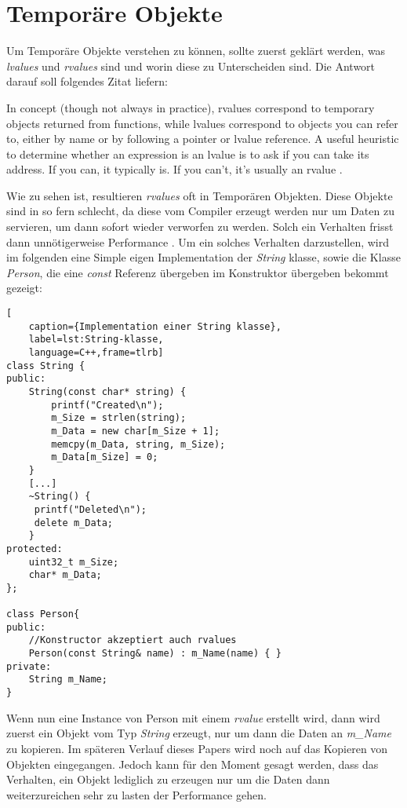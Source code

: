 \section{Temporäre Objekte}\label{sec:tempobj}
Um Temporäre Objekte verstehen zu können, sollte zuerst geklärt werden, was \emph{lvalues} und
\emph{rvalues} sind und worin diese zu Unterscheiden sind. Die Antwort darauf soll folgendes
Zitat liefern:
\begin{zitat}
	In concept (though not always in practice), rvalues correspond to temporary
	objects returned from functions, while lvalues correspond to objects you can refer to, either by
	name or by following a pointer or lvalue reference. A useful heuristic to determine whether an
	expression is an lvalue is to ask if you can take its address. If you can, it typically is. If
	you can’t, it’s usually an rvalue \cite{EffectiveC++}.
\end{zitat}
Wie zu sehen ist, resultieren \emph{rvalues} oft in Temporären Objekten. Diese Objekte sind in so
fern schlecht, da diese vom Compiler erzeugt werden nur um Daten zu servieren, um dann sofort
wieder verworfen zu werden. Solch ein Verhalten frisst dann unnötigerweise Performance
.\cite{HandsOn}
\newline
\newline
Um ein solches Verhalten darzustellen, wird im folgenden eine Simple eigen Implementation der
\emph{String} klasse, sowie die Klasse \emph{Person}, die eine \emph{const} Referenz übergeben im
Konstruktor übergeben bekommt gezeigt:

\begin{lstlisting}[
    caption={Implementation einer String klasse},
    label=lst:String-klasse,
    language=C++,frame=tlrb]
class String {
public:
	String(const char* string) {
		printf("Created\n");
		m_Size = strlen(string);
		m_Data = new char[m_Size + 1];
		memcpy(m_Data, string, m_Size);
		m_Data[m_Size] = 0;
	}
	[...]
	~String() {
     printf("Deleted\n");
     delete m_Data;
    }
protected:
    uint32_t m_Size;
    char* m_Data;
};

class Person{
public:
	//Konstructor akzeptiert auch rvalues
	Person(const String& name) : m_Name(name) { }
private:
	String m_Name;
}
\end{lstlisting}

Wenn nun eine Instance von Person mit einem \emph{rvalue} erstellt wird, dann wird zuerst ein
Objekt vom Typ \emph{String} erzeugt, nur um dann die Daten an \emph{m\_Name} zu kopieren. Im
späteren Verlauf dieses Papers wird noch auf das Kopieren von Objekten eingegangen. Jedoch kann
für den Moment gesagt werden, dass das Verhalten, ein Objekt lediglich zu erzeugen nur um die
Daten dann weiterzureichen sehr zu lasten der Performance gehen.